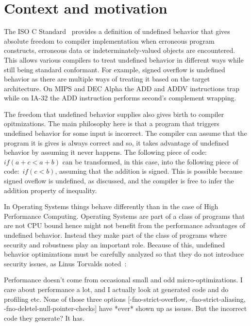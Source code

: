 \section{Context and motivation}

The ISO C Standard~\cite{iso90} provides a definition of undefined
behavior that gives absolute freedom to compiler implementation when
erroneous program constructs, erroneous data or indeterminately-valued
objects are encountered. This allows various compilers to treat
undefined behavior in different ways while still being standard
conformant. For example, signed overflow is undefined behavior as there
are multiple ways of treating it based on the target architecture. On
MIPS and DEC Alpha the ADD and ADDV instructions trap while on IA-32 the
ADD instruction performs second's complement wrapping.

The freedom that undefined behavior supplies also gives birth to
compiler opitmizations. The main philosophy here is that a program that
triggers undefined behavior for some input is incorrect. The compiler
can assume that the program it is gives is always correct and so, it
takes advantage of undefined behavior by assuming it never happens. The
following piece of code:~\textit{\(if (a + c < a + b)\)} can be
transformed, in this case, into the following piece of
code:~\textit{\(if (c < b)\)}, assuming that the addition is signed.
This is possible because signed oveflow is undefined, as discussed, and
the compiler is free to infer the addition property of inequality.


In Operating Systems things behave differently than in the case of High
Performance Computing. Operating Systems are part of a class of programs
that are not CPU bound hence might not benefit from the performance
advantages of undefined behavior. Instead they make part of the class of
programs where security and robustness play an important role. Because
of this, undefined behavior optimizations must be carefully analyzed so
that they do not introduce security issues, as Linus Torvalds
noted~\cite{linusgcc}:
\begin{displayquote}
Performance doesn't come from occasional small and odd
micro-optimizations. I care about performance a lot, and I actually look
at generated code and do profiling etc. None of those three options
[-fno-strict-overflow, -fno-strict-aliasing,
-fno-deletel-null-pointer-checks] have *ever* shown up as issues. But
the incorrect code they generate? It has.
\end{displayquote}

